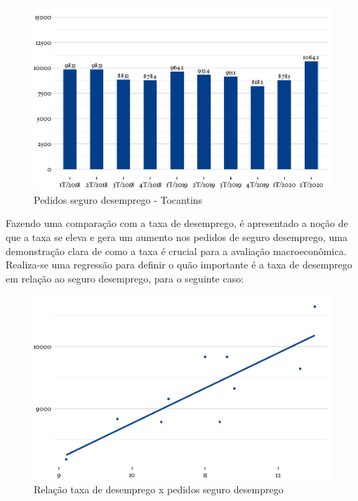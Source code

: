 \begin{figure}[h]
	\caption{Pedidos seguro desemprego - Tocantins}
	\includegraphics[width=\linewidth]{fig/Pedidos seguro desemprego.pdf}
\end{figure}

\par Fazendo uma comparação com a taxa de desemprego, é apresentado a noção de que a taxa se eleva e gera um aumento nos pedidos de seguro desemprego, uma demonstração clara de como a taxa é crucial para a avaliação macroeconômica. Realiza-se uma regressão para definir o quão importante é a taxa de desemprego em relação ao seguro desemprego, para o seguinte caso:

\begin{figure}[h]
	\caption{Relação taxa de desemprego x pedidos seguro desemprego}
	\includegraphics[width=\linewidth]{fig/Relação taxa desemprego x seguro desemprego.pdf}
\end{figure}

